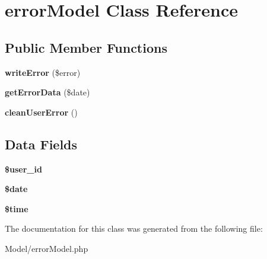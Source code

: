 \hypertarget{classerror_model}{\section{error\-Model Class Reference}
\label{classerror_model}
}
\subsection*{Public Member Functions}
\begin{DoxyCompactItemize}
\item 
\hypertarget{classerror_model_a268a368bcd4dfaa39b9c393dd1c0b858}{{\bfseries write\-Error} (\$error)}\label{classerror_model_a268a368bcd4dfaa39b9c393dd1c0b858}

\item 
\hypertarget{classerror_model_a5485c7a0cb6321d59632e75c3d945d09}{{\bfseries get\-Error\-Data} (\$date)}\label{classerror_model_a5485c7a0cb6321d59632e75c3d945d09}

\item 
\hypertarget{classerror_model_a2797be2d07b2b4efc973c5584c28d023}{{\bfseries clean\-User\-Error} ()}\label{classerror_model_a2797be2d07b2b4efc973c5584c28d023}

\end{DoxyCompactItemize}
\subsection*{Data Fields}
\begin{DoxyCompactItemize}
\item 
\hypertarget{classerror_model_af0fcd925f00973e32f7214859dfb3c6b}{{\bfseries \$user\-\_\-id}}\label{classerror_model_af0fcd925f00973e32f7214859dfb3c6b}

\item 
\hypertarget{classerror_model_a481c918f8d853749e00b5942cabf599a}{{\bfseries \$date}}\label{classerror_model_a481c918f8d853749e00b5942cabf599a}

\item 
\hypertarget{classerror_model_a78db1a0602e3b6ac1d9a1b5ec103c160}{{\bfseries \$time}}\label{classerror_model_a78db1a0602e3b6ac1d9a1b5ec103c160}

\end{DoxyCompactItemize}


The documentation for this class was generated from the following file\-:\begin{DoxyCompactItemize}
\item 
Model/error\-Model.\-php\end{DoxyCompactItemize}

